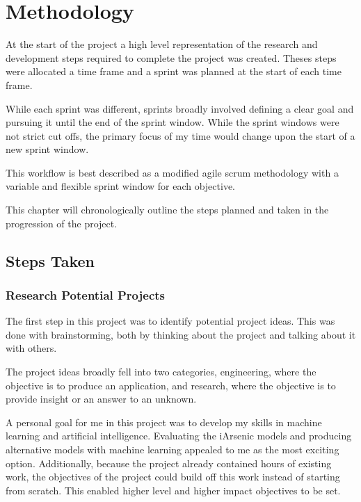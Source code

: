 \chapter{Methodology}

At the start of the project a high level representation of the research and development steps required to complete the project was created. Theses steps were allocated a time frame and a sprint was planned at the start of each time frame.

While each sprint was different, sprints broadly involved defining a clear goal and pursuing it until the end of the sprint window. While the sprint windows were not strict cut offs, the primary focus of my time would change upon the start of a new sprint window.

This workflow is best described as a modified agile scrum methodology with a variable and flexible sprint window for each objective.

This chapter will chronologically outline the steps planned and taken in the progression of the project.


\section{Steps Taken}

\subsection{Research Potential Projects}

The first step in this project was to identify potential project ideas. This was done with brainstorming, both by thinking about the project and talking about it with others.

The project ideas broadly fell into two categories, engineering, where the objective is to produce an application, and research, where the objective is to provide insight or an answer to an unknown.

A personal goal for me in this project was to develop my skills in machine learning and artificial intelligence. Evaluating the iArsenic models and producing alternative models with machine learning appealed to me as the most exciting option. Additionally, because the project already contained hours of existing work, the objectives of the project could build off this work instead of starting from scratch. This enabled higher level and higher impact objectives to be set. 

